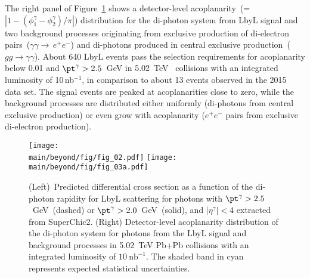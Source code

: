 The right panel of Figure~\ref{fig:lbyl} shows a detector-level  acoplanarity~(=$|1-(\phi^\gamma_1-\phi^\gamma_2)/\pi|$) distribution for the di-photon system from LbyL signal and two background processes originating from exclusive production of di-electron pairs~($\gamma\gamma\rightarrow\,e^+e^-$) and di-photons produced in central exclusive production~($gg\rightarrow \gamma\gamma$). 
About 640 LbyL events pass the selection requirements for acoplanarity below 0.01 and 
$\pt^\gamma>2.5$~GeV in 5.02~TeV \PbPb~collisions with an integrated luminosity of 10\,nb$^{-1}$, 
in comparison to about 13 events observed in the 2015 data set. 
The signal events are peaked at acoplanarities close to zero, while the background processes are distributed either uniformly (di-photons from central exclusive production) or even grow with acoplanarity ($e^+e^-$ pairs from exclusive di-electron production). 

\begin{figure}[!hbt]
\centering
\texttt{[image: \\main/beyond/fig/fig\_02.pdf]}
\texttt{[image: \\main/beyond/fig/fig\_03a.pdf]}
\caption{
(Left)~Predicted differential cross section as a function of the di-photon rapidity for LbyL scattering for photons with
$\pt^\gamma>2.5$~GeV~(dashed) or $\pt^\gamma>2.0$~GeV~(solid), and
$|\eta^\gamma|<4$ extracted from SuperChic2.
(Right) Detector-level acoplanarity distribution of the di-photon system for photons from the LbyL signal and background processes in
  5.02~TeV Pb+Pb collisions with an integrated luminosity of
  $10~\mathrm{nb}^{-1}$. The shaded band in cyan represents expected statistical uncertainties.
}
\label{fig:lbyl}
\end{figure}

